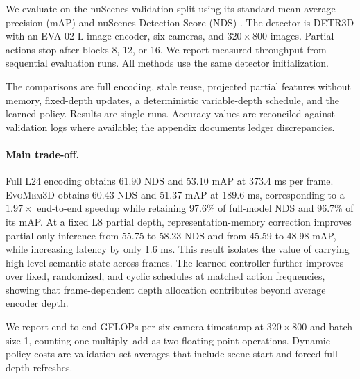 \documentclass[10pt,twocolumn,letterpaper]{article}
\newcommand{\method}{\textsc{EvoMem3D}}
\begin{document}
We evaluate on the nuScenes validation split using its standard mean average precision (mAP) and nuScenes Detection Score (NDS) \cite{caesar2020nuscenes}. The detector is DETR3D with an EVA-02-L image encoder, six cameras, and $320\times800$ images. Partial actions stop after blocks 8, 12, or 16. We report measured throughput from sequential evaluation runs. All methods use the same detector initialization.

The comparisons are full encoding, stale reuse, projected partial features without memory, fixed-depth updates, a deterministic variable-depth schedule, and the learned policy. Results are single runs. Accuracy values are reconciled against validation logs where available; the appendix documents ledger discrepancies.


\paragraph{Main trade-off.}
Full L24 encoding obtains 61.90 NDS and 53.10 mAP at 373.4 ms per
frame. \method{} obtains 60.43 NDS and 51.37 mAP at 189.6 ms,
corresponding to a $1.97\times$ end-to-end speedup while retaining
97.6\% of full-model NDS and 96.7\% of its mAP. At a fixed L8
partial depth, representation-memory correction improves
partial-only inference from 55.75 to 58.23 NDS and from 45.59 to
48.98 mAP, while increasing latency by only 1.6 ms. This result
isolates the value of carrying high-level semantic state across
frames. The learned controller further improves over fixed,
randomized, and cyclic schedules at matched action frequencies,
showing that frame-dependent depth allocation contributes beyond
average encoder depth.

We report end-to-end GFLOPs per six-camera timestamp at
$320\times800$ and batch size 1, counting one multiply--add as two
floating-point operations. Dynamic-policy costs are validation-set
averages that include scene-start and forced full-depth refreshes.
\end{document}
